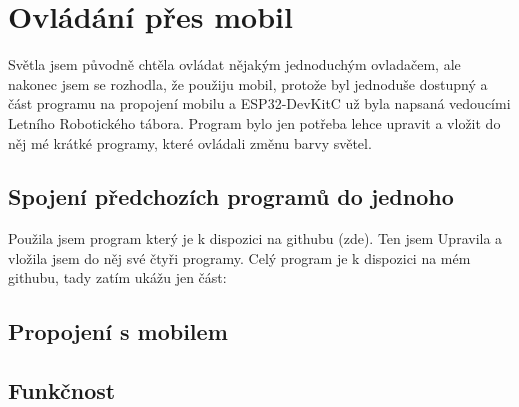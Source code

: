 \chapter{Ovládání přes mobil}
Světla jsem původně chtěla ovládat nějakým jednoduchým ovladačem, ale nakonec jsem se rozhodla, že použiju mobil, protože byl jednoduše dostupný a část programu na propojení mobilu a ESP32-DevKitC už byla napsaná vedoucími Letního Robotického tábora. Program bylo jen potřeba lehce upravit a vložit do něj mé krátké programy, které ovládali změnu barvy světel. 

\section{Spojení předchozích programů do jednoho}
Použila jsem program který je k dispozici na githubu (zde). Ten jsem Upravila a vložila jsem do něj své čtyři programy. Celý program je k dispozici na mém githubu, tady zatím ukážu jen část:

\section{Propojení s mobilem}

\section{Funkčnost}




\newpage